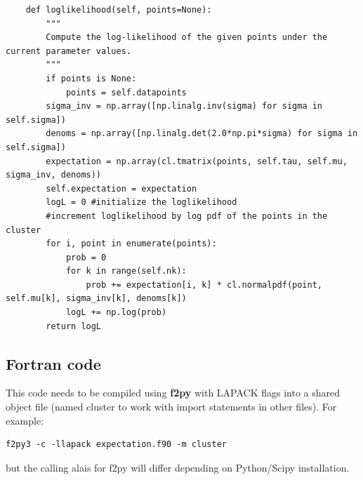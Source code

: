 \documentclass[a4paper]{article}
\begin{document}
\begin{verbatim}
    def loglikelihood(self, points=None):
        """
        Compute the log-likelihood of the given points under the current parameter values.
        """
        if points is None:
            points = self.datapoints
        sigma_inv = np.array([np.linalg.inv(sigma) for sigma in self.sigma])
        denoms = np.array([np.linalg.det(2.0*np.pi*sigma) for sigma in self.sigma])
        expectation = np.array(cl.tmatrix(points, self.tau, self.mu, sigma_inv, denoms))
        self.expectation = expectation
        logL = 0 #initialize the loglikelihood
        #increment loglikelihood by log pdf of the points in the cluster
        for i, point in enumerate(points):
            prob = 0
            for k in range(self.nk):
                prob += expectation[i, k] * cl.normalpdf(point, self.mu[k], sigma_inv[k], denoms[k])
            logL += np.log(prob)
        return logL
\end{verbatim}

\subsection*{Fortran code}

This code needs to be compiled using {\bf f2py} with LAPACK flags into a shared object file (named cluster to work with import statements in other files). For example:
\begin{verbatim}
f2py3 -c -llapack expectation.f90 -m cluster 
\end{verbatim}

but the calling alais for f2py will differ depending on Python/Scipy installation. 
\end{document}
